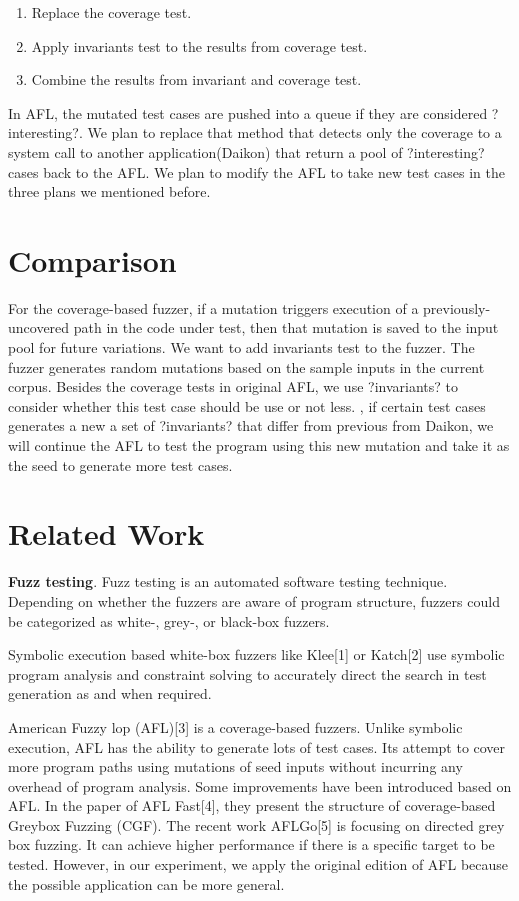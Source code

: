 \documentclass[sigplan,10pt,review]{acmart}\settopmatter{printfolios=true,printccs=false,printacmref=false}
\begin{document}
\begin{enumerate}
\item Replace the coverage test.
\item Apply invariants test to the results from coverage test.
\item Combine the results from invariant and coverage test.
\end{enumerate}

In AFL, the mutated test cases are pushed into a queue if they are considered ?interesting?. We plan to replace that method that detects only the coverage to a system call to another application(Daikon) that return a pool of ?interesting? cases back to the AFL. We plan to modify the AFL to take new test cases in the three plans we mentioned before.

\section{Comparison}
For the coverage-based fuzzer, if a mutation triggers execution of a previously-uncovered path in the code under test, then that mutation is saved to the input pool for future variations. We want to add invariants test to the fuzzer. The fuzzer generates random mutations based on the sample inputs in the current corpus. Besides the coverage tests in original AFL, we use ?invariants? to consider whether this test case should be use or not less. , if certain test cases generates a new a set of ?invariants? that differ from previous from Daikon, we will continue the AFL to test the program using this new mutation and take it as the seed to generate more test cases.

\section{Related Work}
\textbf{Fuzz testing}. Fuzz testing is an automated software testing technique. Depending on whether the fuzzers are aware of program structure, fuzzers could be categorized as white-, grey-, or black-box fuzzers.

Symbolic execution based white-box fuzzers like Klee[1] or Katch[2] use symbolic program analysis and constraint solving to accurately direct the search in test generation as and when required.

American Fuzzy lop (AFL)[3] is a coverage-based fuzzers. Unlike symbolic execution, AFL has the ability to generate lots of test cases. Its attempt to cover more program paths using mutations of seed inputs without incurring any overhead of program analysis. Some improvements have been introduced based on AFL. In the paper of AFL Fast[4], they present the structure of coverage-based Greybox Fuzzing (CGF). The recent work AFLGo[5] is focusing on directed grey box fuzzing. It can achieve higher performance if there is a specific target to be tested. However, in our experiment, we apply the original edition of AFL because the possible application can be more general.
\end{document}
